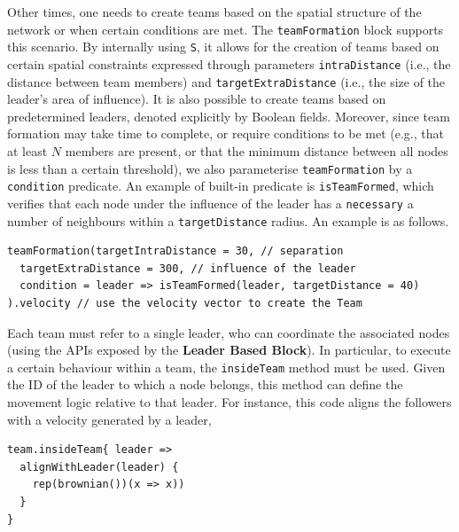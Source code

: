 Other times, one needs to create teams based on the spatial structure of the network or when certain conditions are met. 
%
The \lstinline|teamFormation| block supports this scenario. %
By internally using \lstinline|S|, it allows for the creation of teams based on certain spatial constraints expressed through parameters \lstinline|intraDistance| (i.e., the distance between team members) and
 \lstinline|targetExtraDistance| (i.e., the size of the leader's area of influence). 
%
It is also possible to create teams based on predetermined leaders, denoted explicitly by Boolean fields. %
%
Moreover, since team formation may take time to complete, or require conditions to be met (e.g., that at least $N$ members are present, or that the minimum distance between all nodes is less than a certain threshold),
 we also parameterise \lstinline|teamFormation| by a \lstinline|condition| predicate. 
%
An example of built-in predicate is \lstinline|isTeamFormed|, which verifies that each node under 
 the influence of the leader has a \lstinline|necessary| a number of neighbours
 within a \lstinline|targetDistance| radius.
%
An example is as follows.
\begin{lstlisting}
teamFormation(targetIntraDistance = 30, // separation
  targetExtraDistance = 300, // influence of the leader
  condition = leader => isTeamFormed(leader, targetDistance = 40)
).velocity // use the velocity vector to create the Team
\end{lstlisting}
Each team must refer to a single leader, 
 who can coordinate the associated nodes 
 (using the APIs exposed by the \textbf{Leader Based Block}). 
In particular, to execute a certain behaviour within a team, 
 the \lstinline|insideTeam| method must be used. 
 Given the ID of the leader to which a node belongs, 
 this method can define the movement logic relative to that leader.
%
For instance, this code aligns the followers with a velocity generated by a leader, 
\begin{lstlisting}[xrightmargin=-3.4pt]
team.insideTeam{ leader => 
  alignWithLeader(leader) {
    rep(brownian())(x => x))
  }
}
\end{lstlisting}

